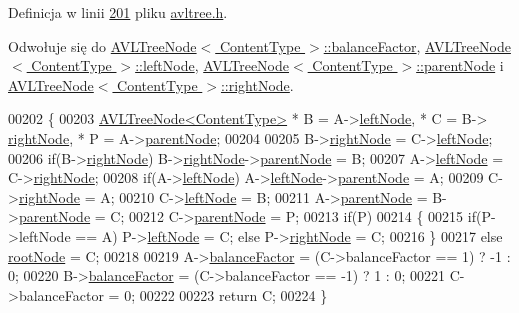 Definicja w linii \hyperlink{avltree_8h_source_l00201}{201} pliku \hyperlink{avltree_8h_source}{avltree.\-h}.



Odwołuje się do \hyperlink{avltreeelement_8h_source_l00024}{A\-V\-L\-Tree\-Node$<$ Content\-Type $>$\-::balance\-Factor}, \hyperlink{avltreeelement_8h_source_l00019}{A\-V\-L\-Tree\-Node$<$ Content\-Type $>$\-::left\-Node}, \hyperlink{avltreeelement_8h_source_l00019}{A\-V\-L\-Tree\-Node$<$ Content\-Type $>$\-::parent\-Node} i \hyperlink{avltreeelement_8h_source_l00019}{A\-V\-L\-Tree\-Node$<$ Content\-Type $>$\-::right\-Node}.


\begin{DoxyCode}
00202     \{
00203       \hyperlink{class_a_v_l_tree_node}{AVLTreeNode<ContentType>} * B = A->\hyperlink{class_a_v_l_tree_node_afc53d4774f375c23795c9eb598f4d7cd}{leftNode}, * C = B->
      \hyperlink{class_a_v_l_tree_node_a51dfb148f27625c89a3a153760517c38}{rightNode}, * P = A->\hyperlink{class_a_v_l_tree_node_ae64d1261fea217d3e85928e7cf2a9151}{parentNode};
00204 
00205       B->\hyperlink{class_a_v_l_tree_node_a51dfb148f27625c89a3a153760517c38}{rightNode} = C->\hyperlink{class_a_v_l_tree_node_afc53d4774f375c23795c9eb598f4d7cd}{leftNode};
00206       \textcolor{keywordflow}{if}(B->\hyperlink{class_a_v_l_tree_node_a51dfb148f27625c89a3a153760517c38}{rightNode}) B->\hyperlink{class_a_v_l_tree_node_a51dfb148f27625c89a3a153760517c38}{rightNode}->\hyperlink{class_a_v_l_tree_node_ae64d1261fea217d3e85928e7cf2a9151}{parentNode} = B;
00207       A->\hyperlink{class_a_v_l_tree_node_afc53d4774f375c23795c9eb598f4d7cd}{leftNode} = C->\hyperlink{class_a_v_l_tree_node_a51dfb148f27625c89a3a153760517c38}{rightNode};
00208       \textcolor{keywordflow}{if}(A->\hyperlink{class_a_v_l_tree_node_afc53d4774f375c23795c9eb598f4d7cd}{leftNode}) A->\hyperlink{class_a_v_l_tree_node_afc53d4774f375c23795c9eb598f4d7cd}{leftNode}->\hyperlink{class_a_v_l_tree_node_ae64d1261fea217d3e85928e7cf2a9151}{parentNode} = A;
00209       C->\hyperlink{class_a_v_l_tree_node_a51dfb148f27625c89a3a153760517c38}{rightNode} = A;
00210       C->\hyperlink{class_a_v_l_tree_node_afc53d4774f375c23795c9eb598f4d7cd}{leftNode} = B;
00211       A->\hyperlink{class_a_v_l_tree_node_ae64d1261fea217d3e85928e7cf2a9151}{parentNode} = B->\hyperlink{class_a_v_l_tree_node_ae64d1261fea217d3e85928e7cf2a9151}{parentNode} = C;
00212       C->\hyperlink{class_a_v_l_tree_node_ae64d1261fea217d3e85928e7cf2a9151}{parentNode} = P;
00213       \textcolor{keywordflow}{if}(P)
00214       \{
00215         \textcolor{keywordflow}{if}(P->leftNode == A) P->\hyperlink{class_a_v_l_tree_node_afc53d4774f375c23795c9eb598f4d7cd}{leftNode} = C; \textcolor{keywordflow}{else} P->\hyperlink{class_a_v_l_tree_node_a51dfb148f27625c89a3a153760517c38}{rightNode} = C;
00216       \}
00217       \textcolor{keywordflow}{else} \hyperlink{class_a_v_l_tree_aee3daa1b05e59d770a95e1274f09eb22}{rootNode} = C;
00218 
00219       A->\hyperlink{class_a_v_l_tree_node_a212c57dab467b42c3ddc50b2aecc05ad}{balanceFactor} = (C->balanceFactor ==  1) ? -1 : 0;
00220       B->\hyperlink{class_a_v_l_tree_node_a212c57dab467b42c3ddc50b2aecc05ad}{balanceFactor} = (C->balanceFactor == -1) ?  1 : 0;
00221       C->balanceFactor = 0;
00222 
00223       \textcolor{keywordflow}{return} C;
00224     \}
\end{DoxyCode}

